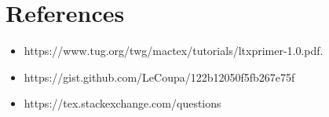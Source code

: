 \documentclass[12pt,oneside,a4paper]{article}
\begin{document}
	\newpage

	\section{References}

	\begin{itemize}
	  \item https://www.tug.org/twg/mactex/tutorials/ltxprimer-1.0.pdf.
	  \item https://gist.github.com/LeCoupa/122b12050f5fb267e75f
	  \item https://tex.stackexchange.com/questions
	\end{itemize}
\end{document}
